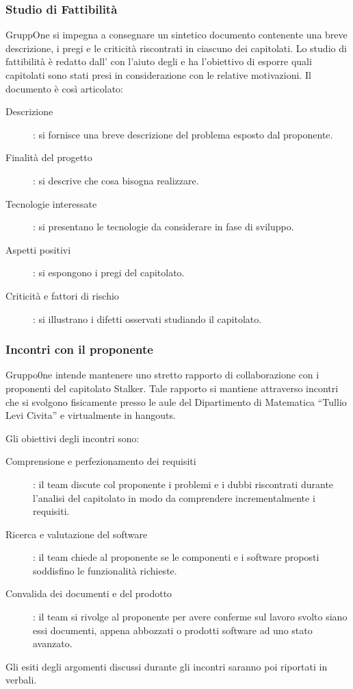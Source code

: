 \documentclass[../norme-di-progetto.tex]{subfiles}
\begin{document}
\subsubsection{Studio di Fattibilità}%
\label{subs:studio_di_fattibilita}
GruppOne si impegna a consegnare un sintetico documento contenente una breve descrizione, i pregi e le criticità riscontrati in ciascuno dei capitolati. Lo studio di fattibilità è redatto dall'
con l'aiuto degli  e ha l'obiettivo di esporre quali capitolati sono stati presi in considerazione con le relative motivazioni. Il documento è così articolato:
\begin{description}
  \item [Descrizione]: si fornisce una breve descrizione del problema esposto dal proponente.
  \item [Finalità del progetto]: si descrive che cosa bisogna realizzare.
  \item [Tecnologie interessate]: si presentano le tecnologie da considerare in fase di sviluppo.
  \item [Aspetti positivi]: si espongono i pregi del capitolato.
  \item [Criticità e fattori di rischio]: si illustrano i difetti osservati studiando il capitolato.
\end{description}

\subsubsection{Incontri con il proponente}%
\label{subs:incontri_con_il_proponente}

Gruppo0ne intende mantenere uno stretto rapporto di collaborazione con i proponenti del capitolato Stalker. Tale rapporto si mantiene attraverso incontri che si svolgono fisicamente presso le aule del Dipartimento di Matematica ``Tullio Levi Civita'' e virtualmente in hangouts.

Gli obiettivi degli incontri sono:
\begin{description}
  \item [Comprensione e perfezionamento dei requisiti]: il team discute col proponente i problemi e i dubbi riscontrati durante l'analisi del capitolato in modo da comprendere incrementalmente i requisiti.
  \item [Ricerca e valutazione del software]: il team chiede al proponente se le componenti e i software proposti soddisfino le funzionalità richieste.
  \item [Convalida dei documenti e del prodotto]: il team si rivolge al proponente per avere conferme sul lavoro svolto siano essi documenti,  appena abbozzati o prodotti software ad uno stato avanzato.
\end{description}
Gli esiti degli argomenti discussi durante gli incontri saranno poi riportati in verbali.
\end{document}

